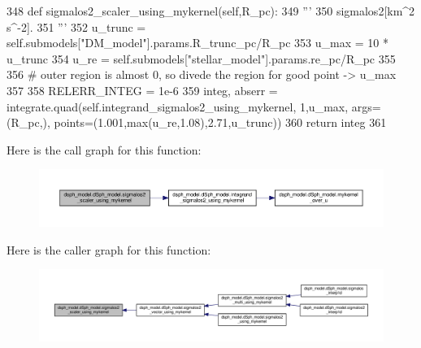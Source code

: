 \begin{DoxyCode}
348     \textcolor{keyword}{def }sigmalos2\_scaler\_using\_mykernel(self,R\_pc):
349         \textcolor{stringliteral}{'''}
350 \textcolor{stringliteral}{        sigmalos2[km^2 s^-2].}
351 \textcolor{stringliteral}{        '''}
352         u\_trunc = self.submodels[\textcolor{stringliteral}{"DM\_model"}].params.R\_trunc\_pc/R\_pc
353         u\_max = 10 * u\_trunc
354         u\_re = self.submodels[\textcolor{stringliteral}{"stellar\_model"}].params.re\_pc/R\_pc
355 
356         \textcolor{comment}{# outer region is almost 0, so divede the region for good point -> u\_max}
357         
358         RELERR\_INTEG = 1e-6
359         integ, abserr =  integrate.quad(self.integrand\_sigmalos2\_using\_mykernel, 1,u\_max, args=(R\_pc,),
      points=(1.001,max(u\_re,1.08),2.71,u\_trunc))
360         \textcolor{keywordflow}{return} integ
361     
\end{DoxyCode}
Here is the call graph for this function\+:\nopagebreak
\begin{figure}[H]
\begin{center}
\leavevmode
\includegraphics[width=350pt]{d0/d25/classdsph__model_1_1dSph__model_a14692f81c0bffc790d5daf7f4e6464c1_cgraph}
\end{center}
\end{figure}
Here is the caller graph for this function\+:\nopagebreak
\begin{figure}[H]
\begin{center}
\leavevmode
\includegraphics[width=350pt]{d0/d25/classdsph__model_1_1dSph__model_a14692f81c0bffc790d5daf7f4e6464c1_icgraph}
\end{center}
\end{figure}
\mbox{\label{classdsph__model_1_1dSph__model_a4e062f0ac546057c1109fd47ec39ed90}} 
